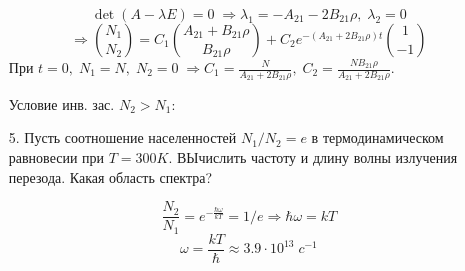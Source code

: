 \documentclass[a4paper]{article}
\begin{document}
\begin{itemize}
		$$\det{(A-\lambda E)} = 0\; \Rightarrow \lambda_1 = - A_{21} - 2 B_{21}\rho,\; \lambda_2 = 0$$
		$$\Rightarrow \binom{N_1}{N_2} = C_1 \binom{A_{21} + B_{21} \rho}{B_{21}\rho} + C_2 e^{-(A_{21} + 2B_{21} \rho)t} \binom{1}{-1} $$
		При $t=0,\; N_1=N,\; N_2=0\; \Rightarrow C_1 = \frac{N}{A_{21} + 2B_{21}\rho},\; C_2 = \frac{NB_{21}\rho}{A_{21} + 2B_{21}\rho}$. \par 
		Условие инв. зас. $N_2 > N_1:$ \par 
		\begin{center}
		\end{center}
		\begin{center}
		\end{center}

	\item[5.] Пусть соотношение населенностей $N_1/N_2 = e$ в термодинамическом равновесии при $T=300K$. ВЫчислить частоту и длину волны излучения перезода. Какая область спектра? \par 
		$$\frac{N_2}{N_1} = e^{-\frac{\hbar \omega}{kT}} = 1/e \Rightarrow \hbar \omega = kT$$
		$$\omega = \frac{kT}{\hbar} \approx 3.9 \cdot 10^{13}\; c^{-1}$$
		\begin{center}
		\end{center}


\end{itemize}
\end{document}
